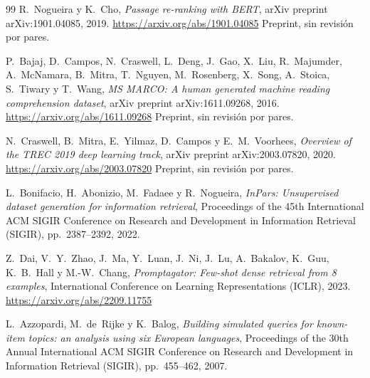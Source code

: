 \documentclass[11pt,letterpaper]{article}
\numberwithin{equation}{section}
\begin{document}
\begin{thebibliography}{99}
R.~Nogueira y K.~Cho,
\textit{Passage re-ranking with {BERT}},
arXiv preprint arXiv:1901.04085, 2019.
\url{https://arxiv.org/abs/1901.04085} Preprint, sin revisión por pares.

P.~Bajaj, D.~Campos, N.~Craswell, L.~Deng, J.~Gao, X.~Liu, R.~Majumder, A.~McNamara, B.~Mitra, T.~Nguyen, M.~Rosenberg, X.~Song, A.~Stoica, S.~Tiwary y T.~Wang,
\textit{{MS MARCO}: A human generated machine reading comprehension dataset},
arXiv preprint arXiv:1611.09268, 2016.
\url{https://arxiv.org/abs/1611.09268} Preprint, sin revisión por pares.

N.~Craswell, B.~Mitra, E.~Yilmaz, D.~Campos y E.~M.~Voorhees,
\textit{Overview of the {TREC} 2019 deep learning track},
arXiv preprint arXiv:2003.07820, 2020.
\url{https://arxiv.org/abs/2003.07820} Preprint, sin revisión por pares.

L.~Bonifacio, H.~Abonizio, M.~Fadaee y R.~Nogueira,
\textit{{InPars}: Unsupervised dataset generation for information retrieval},
Proceedings of the 45th International ACM SIGIR Conference on Research and Development in Information Retrieval (SIGIR), pp.~2387--2392, 2022.

Z.~Dai, V.~Y.~Zhao, J.~Ma, Y.~Luan, J.~Ni, J.~Lu, A.~Bakalov, K.~Guu, K.~B.~Hall y M.-W.~Chang,
\textit{Promptagator: Few-shot dense retrieval from 8 examples},
International Conference on Learning Representations (ICLR), 2023.
\url{https://arxiv.org/abs/2209.11755}

L.~Azzopardi, M.~de~Rijke y K.~Balog,
\textit{Building simulated queries for known-item topics: an analysis using six {E}uropean languages},
Proceedings of the 30th Annual International ACM SIGIR Conference on Research and Development in Information Retrieval (SIGIR), pp.~455--462, 2007.


\end{thebibliography}
\end{document}
